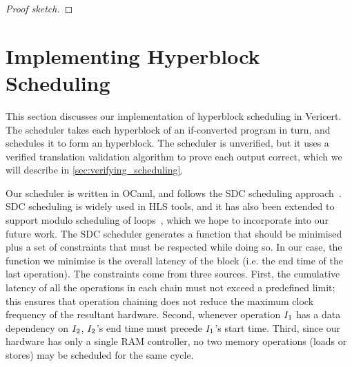 \begin{theorem}
\begin{proof}[Proof sketch]
                                    \end{proof}
\end{theorem}

\section{Implementing Hyperblock Scheduling}
\label{sec:implementing_scheduling}

This section discusses our implementation of hyperblock scheduling in Vericert.
The scheduler takes each hyperblock of an if-converted \rtlblock{} program in
turn, and schedules it to form an \rtlpar{} hyperblock. The scheduler is
unverified, but it uses a verified translation validation algorithm to prove
each output correct, which we will describe in \cref{sec:verifying_scheduling}.

Our scheduler is written in OCaml, and follows the SDC scheduling
approach~\cite{cong06_sdc}. SDC scheduling is widely used in HLS tools, and it has
also been extended to support modulo scheduling of loops~\cite{zhang13_sdc},
which we hope to incorporate into our future work. The SDC scheduler generates a
function that should be minimised plus a set of constraints that must be
respected while doing so. In our case, the function we minimise is the overall latency of the
block (i.e. the end time of the last operation). %
The constraints come from three sources. First, the cumulative latency of all the operations in each
chain must not exceed a predefined limit; this ensures that operation chaining
does not reduce the maximum clock frequency of the resultant hardware. Second, whenever operation $I_1$ has a data dependency on $I_2$, $I_2$'s end time must precede $I_1$'s start time. Third, since our hardware has only a single RAM controller, no two memory operations (loads or stores) may be
scheduled for the same cycle.

